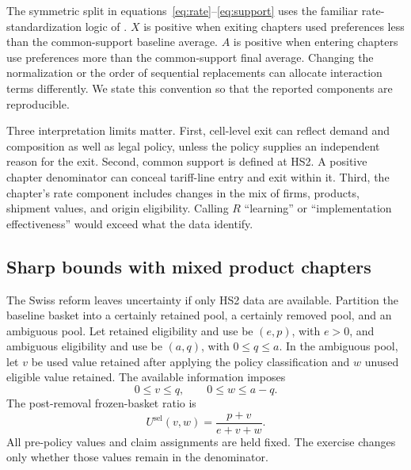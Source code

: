 \documentclass[11pt,a4paper]{article}
\begin{document}
The symmetric split in equations~\eqref{eq:rate}--\eqref{eq:support} uses the familiar rate-standardization logic of \citet{kitagawa1955}. $X$ is positive when exiting chapters used preferences less than the common-support baseline average. $A$ is positive when entering chapters use preferences more than the common-support final average. Changing the normalization or the order of sequential replacements can allocate interaction terms differently. We state this convention so that the reported components are reproducible.

Three interpretation limits matter. First, cell-level exit can reflect demand and composition as well as legal policy, unless the policy supplies an independent reason for the exit. Second, common support is defined at HS2. A positive chapter denominator can conceal tariff-line entry and exit within it. Third, the chapter's rate component includes changes in the mix of firms, products, shipment values, and origin eligibility. Calling $R$ ``learning'' or ``implementation effectiveness'' would exceed what the data identify.

\subsection{Sharp bounds with mixed product chapters}
The Swiss reform leaves uncertainty if only HS2 data are available. Partition the baseline basket into a certainly retained pool, a certainly removed pool, and an ambiguous pool. Let retained eligibility and use be $(e,p)$, with $e>0$, and ambiguous eligibility and use be $(a,q)$, with $0\leq q\leq a$. In the ambiguous pool, let $v$ be used value retained after applying the policy classification and $w$ unused eligible value retained. The available information imposes
\begin{equation}
 0\leq v\leq q,\qquad 0\leq w\leq a-q.
 \label{eq:ambiguous}
\end{equation}
The post-removal frozen-basket ratio is
\begin{equation}
 U^{\mathrm{sel}}(v,w)=\frac{p+v}{e+v+w}.
 \label{eq:selection}
\end{equation}
All pre-policy values and claim assignments are held fixed. The exercise changes only whether those values remain in the denominator.
\end{document}
